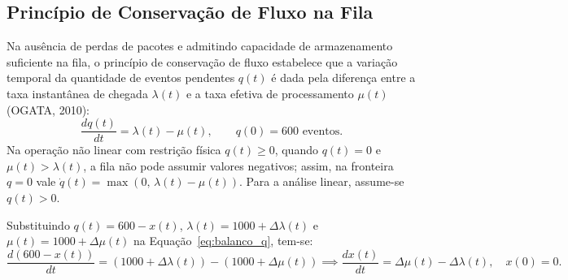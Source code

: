 \begin{figure}[H]
{%
}
\end{figure}

\subsection{Princípio de Conservação de Fluxo na Fila}\label{sec:conservacao}
Na ausência de perdas de pacotes e admitindo capacidade de armazenamento suficiente na fila, o princípio de conservação de fluxo estabelece que a variação temporal da quantidade de eventos pendentes $q(t)$ é dada pela diferença entre a taxa instantânea de chegada $\lambda(t)$ e a taxa efetiva de processamento $\mu(t)$ (OGATA, 2010):
\begin{equation}
    \frac{dq(t)}{dt} = \lambda(t) - \mu(t), \qquad q(0) = 600\text{ eventos}.
    \label{eq:balanco_q}
\end{equation}
Na operação não linear com restrição física $q(t) \ge 0$, quando $q(t)=0$ e $\mu(t)>\lambda(t)$, a fila não pode assumir valores negativos; assim, na fronteira $q = 0$ vale $\dot{q}(t) = \max(0,\, \lambda(t)-\mu(t))$. Para a análise linear, assume-se $q(t) > 0$.

Substituindo $q(t) = 600 - x(t)$, $\lambda(t) = 1000 + \Delta\lambda(t)$ e $\mu(t) = 1000 + \Delta\mu(t)$ na Equação~\eqref{eq:balanco_q}, tem-se:
\begin{equation}
    \frac{d(600 - x(t))}{dt} = (1000 + \Delta\lambda(t)) - (1000 + \Delta\mu(t)) \implies \frac{dx(t)}{dt} = \Delta\mu(t) - \Delta\lambda(t), \quad x(0) = 0.
    \label{eq:balanco_x}
\end{equation}

